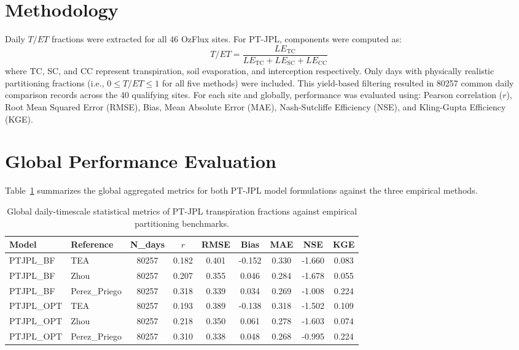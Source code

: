 \documentclass[11pt,a4paper]{article}
\begin{document}
\section{Methodology}
Daily $T/ET$ fractions were extracted for all 46 OzFlux sites. For PT-JPL, components were computed as:
\begin{equation}
T/ET = \frac{LE_{\mathrm{TC}}}{LE_{\mathrm{TC}} + LE_{\mathrm{SC}} + LE_{\mathrm{CC}}}
\end{equation}
where TC, SC, and CC represent transpiration, soil evaporation, and interception respectively.
Only days with physically realistic partitioning fractions (i.e., $0 \le T/ET \le 1$ for all five methods) were included. This yield-based filtering resulted in 80257 common daily comparison records across the 40 qualifying sites. For each site and globally, performance was evaluated using: Pearson correlation ($r$), Root Mean Squared Error (RMSE), Bias, Mean Absolute Error (MAE), Nash-Sutcliffe Efficiency (NSE), and Kling-Gupta Efficiency (KGE).

\newpage
\section{Global Performance Evaluation}
Table~\ref{tab:global_metrics} summarizes the global aggregated metrics for both PT-JPL model formulations against the three empirical methods.

\begin{table}[H]
\centering
\caption{Global daily-timescale statistical metrics of PT-JPL transpiration fractions against empirical partitioning benchmarks.}
\label{tab:global_metrics}
\begin{tabular}{llccccccc}
\toprule
\textbf{Model} & \textbf{Reference} & \textbf{N\_days} & \textbf{$r$} & \textbf{RMSE} & \textbf{Bias} & \textbf{MAE} & \textbf{NSE} & \textbf{KGE} \\
\midrule
  PTJPL\_BF & TEA & 80257 & 0.182 & 0.401 & -0.152 & 0.330 & -1.660 & 0.083 \\
  PTJPL\_BF & Zhou & 80257 & 0.207 & 0.355 & 0.046 & 0.284 & -1.678 & 0.055 \\
  PTJPL\_BF & Perez\_Priego & 80257 & 0.318 & 0.339 & 0.034 & 0.269 & -1.008 & 0.224 \\
  PTJPL\_OPT & TEA & 80257 & 0.193 & 0.389 & -0.138 & 0.318 & -1.502 & 0.109 \\
  PTJPL\_OPT & Zhou & 80257 & 0.218 & 0.350 & 0.061 & 0.278 & -1.603 & 0.074 \\
  PTJPL\_OPT & Perez\_Priego & 80257 & 0.310 & 0.338 & 0.048 & 0.268 & -0.995 & 0.224 \\
\bottomrule
\end{tabular}
\end{table}
\end{document}

